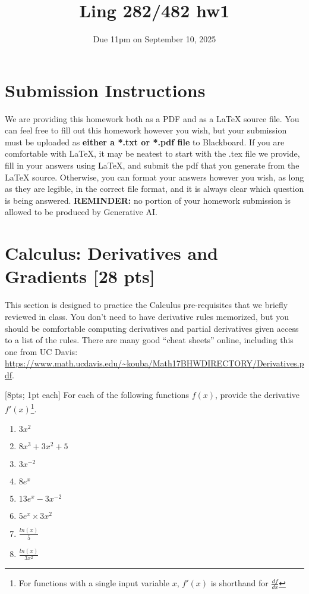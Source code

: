 \documentclass[11pt]{article}
\begin{document}
\title{Ling 282/482 hw1}
\date{\vspace{-0.2in}Due 11pm on September 10, 2025}
\maketitle

\section*{Submission Instructions}
We are providing this homework both as a PDF and as a LaTeX source file. You can feel free to fill out this homework however you wish, but your submission must be uploaded as \textbf{either a *.txt or *.pdf file} to Blackboard. If you are comfortable with LaTeX, it may be neatest to start with the .tex file we provide, fill in your answers using LaTeX, and submit the pdf that you generate from the LaTeX source. Otherwise, you can format your answers however you wish, as long as they are legible, in the correct file format, and it is always clear which question is being answered. \textbf{REMINDER:} no portion of your homework submission is allowed to be produced by Generative AI.

\section{Calculus: Derivatives and Gradients [28 pts]}

This section is designed to practice the Calculus pre-requisites that we briefly reviewed in class. You don't need to have derivative rules memorized, but you should be comfortable computing derivatives and partial derivatives given access to a list of the rules. There are many good ``cheat sheets'' online, including this one from UC Davis: \url{https://www.math.ucdavis.edu/~kouba/Math17BHWDIRECTORY/Derivatives.pdf}.

\vspace{2em}
 [8pts; 1pt each] For each of the following functions $f(x)$, provide the derivative $f'(x)$\footnote{For functions with a single input variable $x$, $f'(x)$ is shorthand for $\frac{df}{dx}$}.

\begin{enumerate}[label=\alph*.]
    \setlength\itemsep{1em}
    \item $3x^2$
    \item $8x^3 + 3x^2 + 5$
    \item $3x^{-2}$
    \item $8e^x$
    \item $13e^x - 3x^{-2}$
    \item $5e^x \times 3x^2$
    \item $\frac{ln(x)}{5}$
    \item $\frac{ln(x)}{3x^2}$
\end{enumerate}
\end{document}
